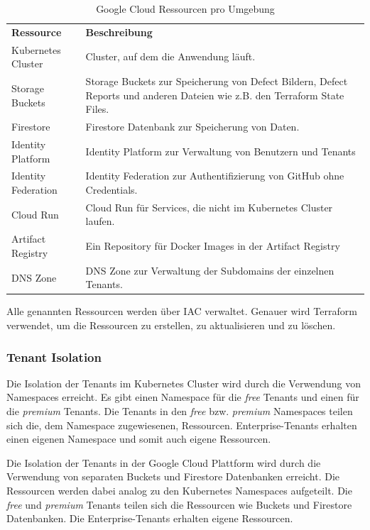 \renewcommand{\arraystretch}{1.5}
{
\begin{longtable}{l p{10cm}}
  \caption{Google Cloud Ressourcen pro Umgebung}
  \label{tab:google-cloud-ressourcen} \\
  \textbf{Ressource} & \textbf{Beschreibung} \\ [1ex]
  Kubernetes Cluster & Cluster, auf dem die Anwendung läuft. \\ [0.5ex]
  Storage Buckets  & Storage Buckets zur Speicherung von Defect Bildern, Defect Reports und anderen Dateien wie z.B. den Terraform State Files. \\ [0.5ex]
  Firestore & Firestore Datenbank zur Speicherung von Daten. \\ [0.5ex]
  Identity Platform & Identity Platform zur Verwaltung von Benutzern und Tenants \\ [0.5ex]
  Identity Federation & Identity Federation zur Authentifizierung von GitHub ohne Credentials. \\ [0.5ex]
  Cloud Run & Cloud Run für Services, die nicht im Kubernetes Cluster laufen. \\ [0.5ex]
  Artifact Registry & Ein Repository für Docker Images in der Artifact Registry \\ [0.5ex]
  DNS Zone & DNS Zone zur Verwaltung der Subdomains der einzelnen Tenants. \\ [0.5ex]
\end{longtable}}

Alle genannten Ressourcen werden über IAC verwaltet. 
Genauer wird Terraform verwendet, um die Ressourcen zu erstellen, zu aktualisieren und zu löschen.

\subsubsection{Tenant Isolation}

Die Isolation der Tenants im Kubernetes Cluster wird durch die Verwendung von Namespaces erreicht.
Es gibt einen Namespace für die \textit{free} Tenants und einen für die \textit{premium} Tenants.
Die Tenants in den \textit{free} bzw. \textit{premium} Namespaces teilen sich die, dem Namespace zugewiesenen, Ressourcen.
Enterprise-Tenants erhalten einen eigenen Namespace und somit auch eigene Ressourcen.

Die Isolation der Tenants in der Google Cloud Plattform wird durch die Verwendung von 
separaten Buckets und Firestore Datenbanken erreicht. Die Ressourcen werden dabei 
analog zu den Kubernetes Namespaces aufgeteilt. Die \textit{free} und \textit{premium} Tenants
teilen sich die Ressourcen wie Buckets und Firestore Datenbanken. Die Enterprise-Tenants
erhalten eigene Ressourcen.

